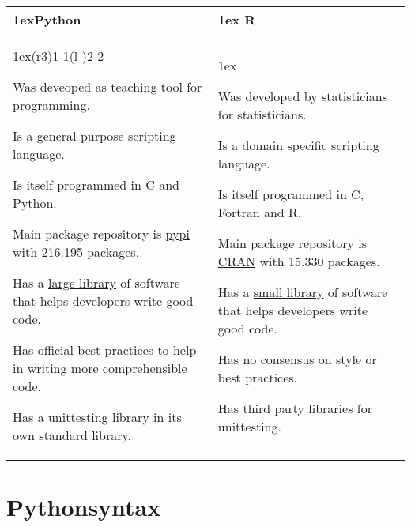 \documentclass{article}
\begin{document}
\begin{table}[h]
    \begin{tabularx}{\linewidth}{>{\parskip1ex}X@{\kern4\tabcolsep}>{\parskip1ex}X}
        \toprule
        \hfil\bfseries Python
         &
        \hfil\bfseries R
        \\\cmidrule(r{3\tabcolsep}){1-1}\cmidrule(l{-\tabcolsep}){2-2}

        Was deveoped as teaching tool for programming.

        Is a general purpose scripting language.

        Is itself programmed in C and Python.

        Main package repository is \href{https://pypi.org/}{pypi} with 216.195 packages.

        Has a \href{https://github.com/mre/awesome-static-analysis\#python}{large library}
        of software that helps developers write good code.

        Has \href{https://www.python.org/dev/peps/pep-0008/}{official best practices}
        to help in writing more comprehensible code.

        Has a unittesting library in its own standard library.

         &

        Was developed by statisticians for statisticians.

        Is a domain specific scripting language.

        Is itself programmed in C, Fortran and R.

        Main package repository is \href{https://cran.r-project.org/}{CRAN} with 15.330 packages.

        Has a \href{https://github.com/mre/awesome-static-analysis\#r}{small library}
        of software that helps developers write good code.

        Has no consensus on style or best practices.

        Has third party libraries for unittesting.

        \\\bottomrule
    \end{tabularx}
\end{table}

\section{Pythonsyntax}
\end{document}
